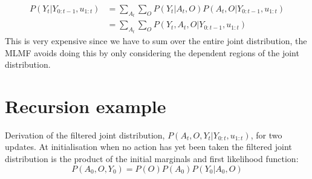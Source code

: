 \begin{appendices}
\begin{align}
 P(Y_t|Y_{0:t-1},u_{1:t}) &= \sum\limits_{A_t} \sum\limits_O  P(Y_t|A_{t},O) P(A_{t},O|Y_{0:t-1},u_{1:t}) \\
			  &= \sum\limits_{A_t} \sum\limits_O  P(Y_t,A_{t},O|Y_{0:t-1},u_{1:t})
\end{align}
This is very expensive since we have to sum over the entire joint distribution, the MLMF avoids doing this by only considering the dependent 
regions of the joint distribution.

\section{Recursion example}\label{appendix:recursion_example}

Derivation of the filtered joint distribution, $P(A_t,O,Y_t|Y_{0:t},u_{1:t})$, for 
two updates. At initialisation when no action has yet been taken the filtered joint distribution 
is the product of the initial marginals and first likelihood function:
\begin{equation}
  P(A_0,O,Y_0) = P(O) P(A_0) P(Y_0|A_0,O) 
\end{equation}
  

\end{appendices}

